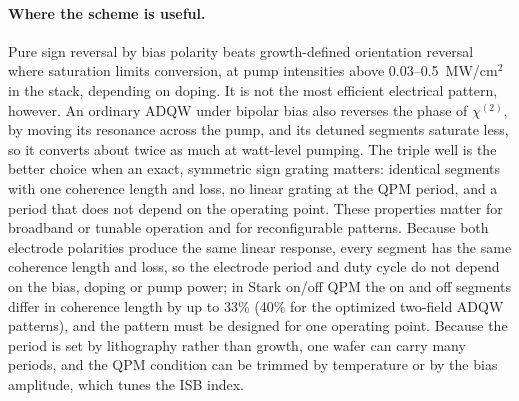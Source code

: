 \documentclass[11pt]{article}
\newcommand{\chitwo}{\chi^{(2)}}
\begin{document}
\paragraph{Where the scheme is useful.} Pure sign reversal by bias polarity beats growth-defined orientation reversal where saturation limits conversion, at pump intensities above 0.03--0.5~MW/cm$^2$ in the stack, depending on doping. It is not the most efficient electrical pattern, however. An ordinary ADQW under bipolar bias also reverses the phase of $\chitwo$, by moving its resonance across the pump, and its detuned segments saturate less, so it converts about twice as much at watt-level pumping. The triple well is the better choice when an exact, symmetric sign grating matters: identical segments with one coherence length and loss, no linear grating at the QPM period, and a period that does not depend on the operating point. These properties matter for broadband or tunable operation and for reconfigurable patterns. Because both electrode polarities produce the same linear response, every segment has the same coherence length and loss, so the electrode period and duty cycle do not depend on the bias, doping or pump power; in Stark on/off QPM the on and off segments differ in coherence length by up to 33\% (40\% for the optimized two-field ADQW patterns), and the pattern must be designed for one operating point. Because the period is set by lithography rather than growth, one wafer can carry many periods, and the QPM condition can be trimmed by temperature or by the bias amplitude, which tunes the ISB index.
\end{document}
